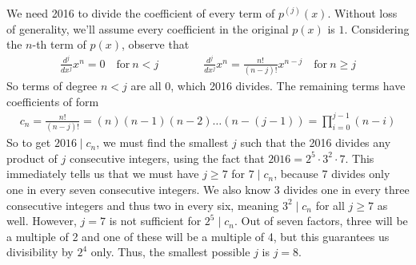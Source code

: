 \begin{solution}[8]
    We need 2016 to divide the coefficient of every term of $p^{(j)}(x)$. Without loss of generality, we'll assume every coefficient in the original $p(x)$ is $1$. Considering the $n$-th term of $p(x)$, observe that
    \begin{align*}
        \frac{d^j}{dx^j}x^n = 0 \quad \text{for}\ n < j \qquad \qquad \frac{d^j}{dx^j}x^n = \frac{n!}{(n-j)!}x^{n-j} \quad \text{for}\ n \geq j
    \end{align*}
    So terms of degree $n<j$ are all $0$, which 2016 divides. The remaining terms have coefficients of form
    \begin{align*}
        c_n = \frac{n!}{(n-j)!} = (n)(n-1)(n-2)\dots(n-(j-1)) = \prod_{i=0}^{j-1}(n-i)
    \end{align*}
    So to get $2016 \mid c_n$, we must find the smallest $j$ such that the 2016 divides any product of $j$ consecutive integers, using the fact that $2016 = 2^5 \cdot 3^2 \cdot 7$. This immediately tells us that we must have $j \geq 7$ for $7 \mid c_n$, because 7 divides only one in every seven consecutive integers. We also know 3 divides one in every three consecutive integers and thus two in every six, meaning $3^2 \mid c_n$ for all $j \geq 7$ as well. However, $j = 7$ is not sufficient for $2^5 \mid c_n$. Out of seven factors, three will be a multiple of 2 and one of these will be a multiple of 4, but this guarantees us divisibility by $2^4$ only. Thus, the smallest possible $j$ is $j =\boxed{8}$.
\end{solution}
